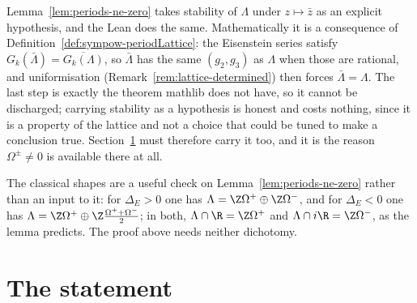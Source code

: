 \begin{remark}
  \label{rem:lattice-conj}
  Lemma~\ref{lem:periods-ne-zero} takes stability of $\Lambda$ under $z \mapsto \bar{z}$ as an
  explicit hypothesis, and the Lean does the same. Mathematically it is a consequence of
  Definition~\ref{def:sympow-periodLattice}: the Eisenstein series satisfy
  $G_{k}(\bar{\Lambda}) = \overline{G_{k}(\Lambda)}$, so $\bar{\Lambda}$ has the same
  $(g_{2},g_{3})$ as $\Lambda$ when those are rational, and uniformisation
  (Remark~\ref{rem:lattice-determined}) then forces $\bar{\Lambda}=\Lambda$. The last step is
  exactly the theorem mathlib does not have, so it cannot be discharged; carrying stability as
  a hypothesis is honest and costs nothing, since it is a property of the lattice and not a
  choice that could be tuned to make a conclusion true. Section~\ref{sec:sympow-statement} must
  therefore carry it too, and it is the reason
  $\Omega^{\pm} \neq 0$ is available there at all.

  The classical shapes are a useful check on Lemma~\ref{lem:periods-ne-zero} rather than an
  input to it: for $\Delta_{E}>0$ one has
  $\Lambda = \Z\Omega^{+}\oplus\Z\Omega^{-}$, and for $\Delta_{E}<0$ one has
  $\Lambda = \Z\Omega^{+}\oplus\Z\frac{\Omega^{+}+\Omega^{-}}{2}$; in both,
  $\Lambda \cap \R = \Z\Omega^{+}$ and $\Lambda \cap i\R = \Z\Omega^{-}$, as the lemma
  predicts. The proof above needs neither dichotomy.
\end{remark}

\section{The statement}
\label{sec:sympow-statement}

